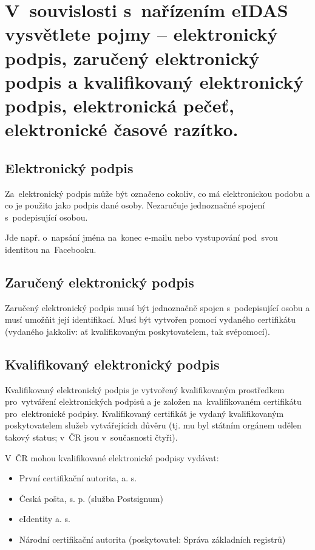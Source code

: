 

\clearpage
\section{V~souvislosti s~nařízením eIDAS vysvětlete pojmy -- elektronický podpis, zaručený elektronický podpis a kvalifikovaný elektronický podpis, elektronická pečeť, elektronické časové razítko.}

\subsection{Elektronický podpis}

Za~elektronický podpis může být označeno cokoliv, co má elektronickou podobu a co je použito jako podpis dané osoby.
Nezaručuje jednoznačné spojení s~podepisující osobou.

Jde např. o~napsání jména na~konec e-mailu nebo vystupování pod~svou identitou na~Facebooku.


\subsection{Zaručený elektronický podpis}

Zaručený elektronický podpis musí být jednoznačně spojen s~podepisující osobu a musí umožňit její identifikací.
Musí být vytvořen pomocí vydaného certifikátu (vydaného jakkoliv: ať kvalifikovaným poskytovatelem, tak svépomocí).


\subsection{Kvalifikovaný elektronický podpis}

Kvalifikovaný elektronický podpis je vytvořený kvalifikovaným prostředkem pro~vytváření elektronických podpisů a je založen na~kvalifikovaném certifikátu pro~elektronické podpisy.
Kvalifikovaný certifikát je vydaný kvalifikovaným poskytovatelem služeb vytvářejících důvěru (tj. mu byl státním orgánem udělen takový status; v~ČR jsou v~současnosti čtyři).

V~ČR mohou kvalifikované elektronické podpisy vydávat:
\vspace*{-0.5em}\begin{itemize}
\item První certifikační autorita, a. s.
\item Česká pošta, s. p. (služba Postsignum)
\item eIdentity a. s.
\item Národní certifikační autorita (poskytovatel: Správa základních registrů)
\end{itemize}


